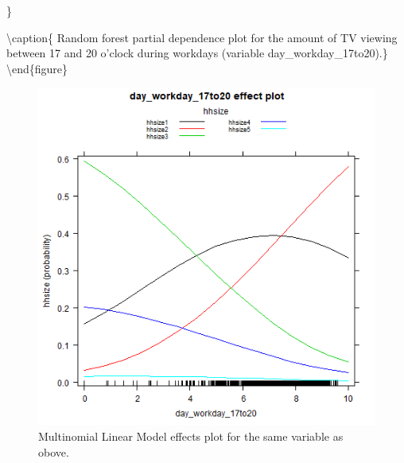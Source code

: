 \documentclass[]{article}
\begin{document}
\}

\textbackslash{}caption\{\label{fig:fig13} Random forest partial
dependence plot for the amount of TV viewing between 17 and 20 o'clock
during workdays (variable
day\_workday\_17to20).\}\label{fig:unnamed-chunk-33}
\textbackslash{}end\{figure\}

\begin{figure}

{\centering \includegraphics[width=0.55\linewidth]{../data/partialplot.mnr.day_workday_17to20} 

}

\caption{\label{fig:fig14} Multinomial Linear Model effects plot for the same variable as obove.}\label{fig:unnamed-chunk-34}
\end{figure}
\end{document}
